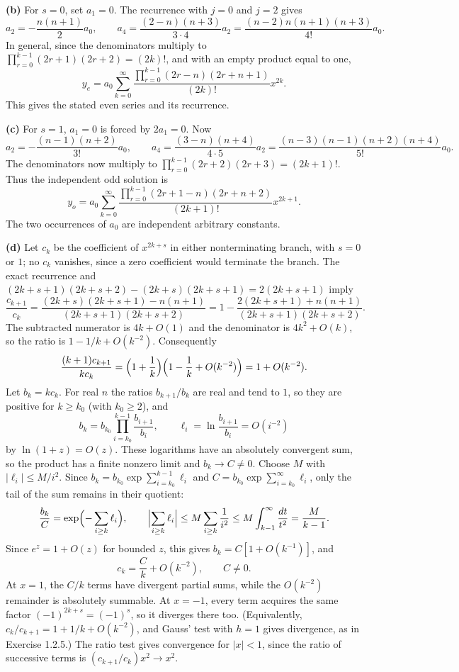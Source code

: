 \textbf{(b)} For $s=0$, set $a_1=0$.  The recurrence with $j=0$ and
$j=2$ gives
\[
a_2=-\frac{n(n+1)}{2}a_0,\qquad
 a_4=\frac{(2-n)(n+3)}{3\cdot4}a_2
=\frac{(n-2)n(n+1)(n+3)}{4!}a_0.
\]
In general, since the denominators multiply to
$\prod_{r=0}^{k-1}(2r+1)(2r+2)=(2k)!$, and with an empty product equal
to one,
\[
y_e=a_0\sum_{k=0}^{\infty}
\frac{\prod_{r=0}^{k-1}(2r-n)(2r+n+1)}{(2k)!}x^{2k}.
\]
This gives the stated even series and its recurrence.

\textbf{(c)} For $s=1$, $a_1=0$ is forced by $2a_1=0$.  Now
\[
a_2=-\frac{(n-1)(n+2)}{3!}a_0,
\qquad
 a_4=\frac{(3-n)(n+4)}{4\cdot5}a_2
=\frac{(n-3)(n-1)(n+2)(n+4)}{5!}a_0.
\]
The denominators now multiply to
$\prod_{r=0}^{k-1}(2r+2)(2r+3)=(2k+1)!$.
Thus the independent odd solution is
\[
y_o=a_0\sum_{k=0}^{\infty}
\frac{\prod_{r=0}^{k-1}(2r+1-n)(2r+n+2)}{(2k+1)!}x^{2k+1}.
\]
The two occurrences of $a_0$ are independent arbitrary constants.

\textbf{(d)} Let $c_k$ be the coefficient of $x^{2k+s}$ in either
nonterminating branch, with $s=0$ or $1$; no $c_k$ vanishes, since a
zero coefficient would terminate the branch.  The exact recurrence
and $(2k+s+1)(2k+s+2)-(2k+s)(2k+s+1)=2(2k+s+1)$ imply
\[
\frac{c_{k+1}}{c_k}
=\frac{(2k+s)(2k+s+1)-n(n+1)}{(2k+s+1)(2k+s+2)}
=1-\frac{2(2k+s+1)+n(n+1)}{(2k+s+1)(2k+s+2)}.
\]
The subtracted numerator is $4k+O(1)$ and the denominator is
$4k^2+O(k)$, so the ratio is $1-1/k+O(k^{-2})$.
Consequently
\[
\frac{(k+1)c_{k+1}}{kc_k}
=\Bigl(1+\frac1k\Bigr)\Bigl(1-\frac1k+O(k^{-2})\Bigr)
=1+O(k^{-2}).
\]
Let $b_k=kc_k$.  For real $n$ the ratios $b_{k+1}/b_k$ are real and
tend to $1$, so they are positive for $k\ge k_0$ (with $k_0\ge2$), and
\[
b_k=b_{k_0}\prod_{i=k_0}^{k-1}\frac{b_{i+1}}{b_i},\qquad
\ell_i=\ln\frac{b_{i+1}}{b_i}=O(i^{-2})
\]
by $\ln(1+z)=O(z)$.  These logarithms have an absolutely convergent
sum, so the product has a finite nonzero limit and $b_k\to C\ne0$.
Choose $M$ with $|\ell_i|\le M/i^2$.  Since
$b_k=b_{k_0}\exp\sum_{i=k_0}^{k-1}\ell_i$ and
$C=b_{k_0}\exp\sum_{i=k_0}^{\infty}\ell_i$, only the tail of the sum
remains in their quotient:
\[
\frac{b_k}{C}=\exp\Bigl(-\sum_{i\ge k}\ell_i\Bigr),\qquad
\Bigl|\sum_{i\ge k}\ell_i\Bigr|\le M\sum_{i\ge k}\frac1{i^2}
\le M\int_{k-1}^{\infty}\frac{dt}{t^2}=\frac M{k-1}.
\]
Since $e^z=1+O(z)$ for bounded $z$, this gives $b_k=C[1+O(k^{-1})]$,
and
\[
c_k=\frac Ck+O(k^{-2}),\qquad C\ne0.
\]
At $x=1$, the $C/k$ terms have divergent partial sums, while the
$O(k^{-2})$ remainder is absolutely summable. At $x=-1$, every
term acquires the same factor $(-1)^{2k+s}=(-1)^s$,
so it diverges there too.  (Equivalently,
$c_k/c_{k+1}=1+1/k+O(k^{-2})$, and Gauss' test with $h=1$ gives
divergence, as in Exercise 1.2.5.)  The ratio test gives convergence
for $|x|<1$, since the ratio of successive terms is
$(c_{k+1}/c_k)x^2\to x^2$.

